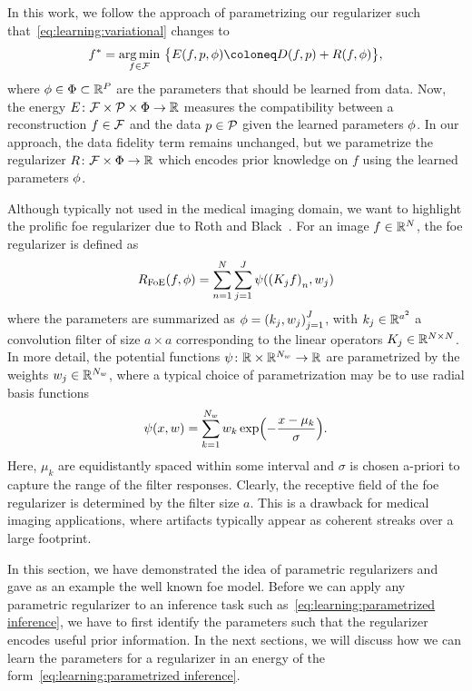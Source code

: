 \documentclass[../ml-ct.tex]{subfiles}
\begin{document}
In this work, we follow the approach of parametrizing our regularizer such that~\cref{eq:learning:variational} changes to
\begin{equation}
	\optimal{f}{} = \argmin_{f \in \set{F}}\ \bigl\{ E(f, p, \params) \coloneq D(f, p) + R(f, \params) \bigr\},%
	\label{eq:learning:parametrized inference}
\end{equation}
where \( \phi \in \Phi \subset \mathbb{R}^P \) are the parameters that should be learned from data.
Now, the energy \( E\colon\mathcal{F} \times \mathcal{P} \times \Phi\to\mathbb{R} \) measures the compatibility between a reconstruction \( f \in \mathcal{F} \) and the data \( p \in \mathcal{P} \) given the learned parameters \( \phi \).
In our approach, the data fidelity term remains unchanged, but we parametrize the regularizer \( R\colon\mathcal{F} \times \Phi\to\mathbb{R} \) which encodes prior knowledge on \( f \) using the learned parameters \( \phi \).

Although typically not used in the medical imaging domain, we want to highlight the prolific \gls{foe} regularizer due to Roth and Black~\cite{roth_fields_2005}.
For an image \( f \in \mathbb{R}^N \), the \gls{foe} regularizer is defined as
\begin{equation}
R_{\text{FoE}}(f, \phi) = \sum_{n=1}^N \sum_{j=1}^J \psi({(K_j f)}_n, w_j)
\end{equation}
where the parameters are summarized as \( \phi = {(k_j, w_j)}_{j=1}^J \), with \( k_j \in \mathbb{R}^{a^2} \) a convolution filter of size \( a \times a \) corresponding to the linear operators \( K_j \in \mathbb{R}^{N \times N} \).
In more detail, the potential functions \( \psi\colon\mathbb{R} \times \mathbb{R}^{N_w}\to\mathbb{R} \) are parametrized by the weights \( w_j \in \mathbb{R}^{N_w} \), where a typical choice of parametrization may be to use radial basis functions
\begin{equation}
	\psi(x, w) = \sum_{k=1}^{N_w} w_k \exp\Bigl( -\frac{x - \mu_k}{\sigma} \Bigr).
\end{equation}
Here, \( \mu_k \) are equidistantly spaced within some interval and \( \sigma \) is chosen a-priori to capture the range of the filter responses.
Clearly, the receptive field of the \gls{foe} regularizer is determined by the filter size \( a \).
This is a drawback for medical imaging applications, where artifacts typically appear as coherent streaks over a large footprint.

In this section, we have demonstrated the idea of parametric regularizers and gave as an example the well known \gls{foe} model.
Before we can apply any parametric regularizer to an inference task such as~\cref{eq:learning:parametrized inference}, we have to first identify the parameters such that the regularizer encodes useful prior information.
In the next sections, we will discuss how we can learn the parameters for a regularizer in an energy of the form~\cref{eq:learning:parametrized inference}.
\end{document}
